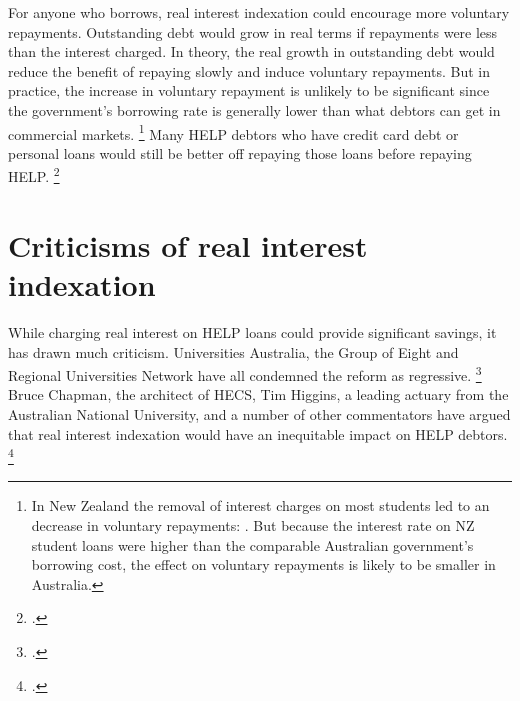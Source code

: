 \documentclass[embargoed]{grattan}
\begin{document}
For anyone who borrows, real interest indexation could encourage more voluntary repayments.
Outstanding debt would grow in real terms if repayments were less than the interest charged.
In theory, the real growth in outstanding debt would reduce the benefit of repaying slowly and induce voluntary repayments.
But in practice, the increase in voluntary repayment is unlikely to be significant since the government's borrowing rate is generally lower than what debtors can get in commercial markets.%
\footnote{In New Zealand the removal of interest charges on most students led to an decrease in voluntary repayments: \textcite[][34]{EducationNZ2013Studentloanscheme}.
But because the interest rate on NZ student loans were higher than the comparable Australian government's borrowing cost, the effect on voluntary repayments is likely to be smaller in Australia.} Many \gls{HELP} debtors who have credit card debt or personal loans would still be better off repaying those loans before repaying \gls{HELP}\@.%
\footcite{MoneySmart2016Payingyouruni}

\section{Criticisms of real interest indexation}\label{sec:criticisms-of-real-interest-indexation}

While charging real interest on \gls{HELP} loans could provide significant savings, it has drawn much criticism.
Universities Australia, the Group of Eight and Regional Universities Network have all condemned the reform as regressive.%
\footcites{Eight2015Go8submissionSenate}{Australia2015UniversitiesAustraliaSubmission}{RUN2014RUNGo8urge} 
Bruce Chapman, the architect of \gls{HECS}, Tim Higgins, a leading actuary from the Australian National University, and a number of other commentators have argued that real interest indexation would have an inequitable impact on \gls{HELP} debtors.%
\footcites{Chapman2014InquiryprovisionsHigher}{Koshy2014effect201415}{Kniest2014endpublichigher}{Struthers-2015-Getting-in-early-avoid-gender-stereotype}
\end{document}
